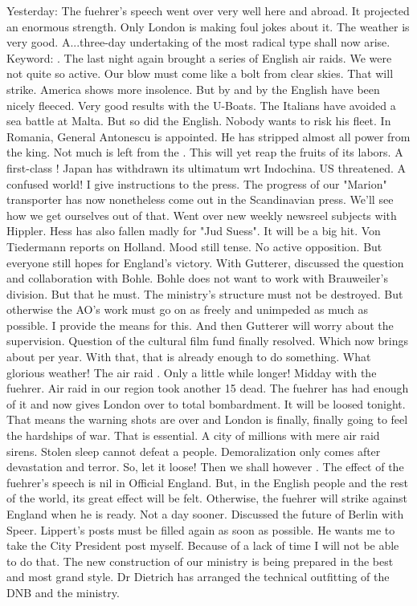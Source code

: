 Yesterday: The fuehrer's speech went over very well here and abroad. It projected an enormous strength. Only London is making foul jokes about it.  The weather is very good. A...three-day undertaking of the most radical type shall now arise. Keyword: . The last night again brought a series of English air raids. We were not quite so active. Our blow must come like a bolt from clear skies. That will strike. America shows more insolence. But by and by the English have been nicely fleeced. Very good results with the U-Boats. The Italians have avoided a sea battle at Malta. But so did the English.  Nobody wants to risk his fleet. In Romania, General Antonescu is appointed. He has stripped almost all power from the king. Not much is left from the . This  will yet reap the fruits of its labors. A first-class ! Japan has withdrawn its ultimatum wrt Indochina. US threatened. A confused world! I give instructions to the press. The progress of our "Marion" transporter has now nonetheless come out in the Scandinavian press. We'll see how we get ourselves out of that. Went over new weekly newsreel subjects with Hippler. Hess has also fallen madly for "Jud Suess". It will be a big hit. Von Tiedermann reports on Holland. Mood still tense. No active opposition. But everyone still hopes for England's victory.  With Gutterer, discussed the  question and collaboration with Bohle. Bohle does not want to work with Brauweiler's division. But that he must. The ministry's structure must not be destroyed. But otherwise the AO's work must go on as freely and unimpeded as much as possible. I provide the means for this. And then Gutterer will worry about the supervision. Question of the cultural film fund finally resolved. Which now brings about  per year. With that, that is already enough to do something. What glorious weather! The air raid . Only a little while longer! Midday with the fuehrer. Air raid in our region took another 15 dead. The fuehrer has had enough of it and now gives London over to total bombardment. It will be loosed tonight. That means the warning shots are over and London is finally, finally going to feel the hardships of war. That is essential. A city of millions  with mere air raid sirens. Stolen sleep cannot defeat a people. Demoralization only comes after devastation and terror. So, let it loose! Then we shall however . The effect of the fuehrer's speech is nil in Official England. But, in the English people and the rest of the world, its great effect will be felt. Otherwise, the fuehrer will strike against England when he is ready. Not a day sooner. Discussed the future of Berlin with Speer. Lippert's posts must be filled again as soon as possible. He wants me to take the City President post myself. Because of a lack of time I will not be able to do that. The new construction of our ministry is being prepared in the best and most grand style. Dr Dietrich has arranged the technical outfitting of the DNB and the ministry. 